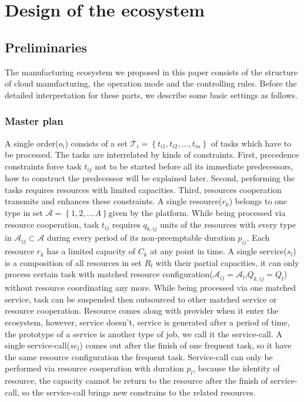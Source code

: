 \section{Design of the ecosystem} %
\label{sec:design_of_the_ecosystem}
\subsection{Preliminaries} %
\label{sub:preliminaries}
The manufacturing ecosystem we proposed in this paper consists of the structure of cloud manufacturing, the operation mode and the controlling rules. Before the detailed interpretation for these parts, we describe some basic settings as follows.

\subsubsection{Master plan} %
\label{ssub:master_plam}
A single order($o_i$) consists of a set $\mathcal{T}_i = \left\{ t_{i1},t_{i2},\dots,t_{in}\right\}$ of tasks which have to be processed. The tasks are interrelated by kinds of constraints. First, precedence constraints force task $t_{ij}$ not to be started before all its immediate predecessors, how to construct the predecessor will be explained later. Second, performing the tasks requires resources with limited capacities. Third, resources cooperation transmits and enhances these constraints.
A single resource($r_k$) belongs to one type in set $\mathcal{A} = \left\{1,2,\dots\,A\right\}$given by the platform. While being processed via resource cooperation, task $t_{ij}$ requires $q_{k,ij}$ units of the resources with every type in $\mathcal{A}_{ij}\subset\mathcal{A}$ during every period of its non-preemptable duration $p_{ij}$. Each resource $r_k$ has a limited capacity of $C_k$ at any point in time.
A single service($s_l$) is a composition of all resources in set $R_l$ with their partial capacities, it can only process certain task with matched resource configuration($\mathcal{A}_{ij}=\mathcal{A}_l$,$Q_{k,ij}=Q_l$) without resource coordinating any more. While being processed via one matched service, task can be suspended then outsourced to other matched service or resource cooperation.
Resource comes along with provider when it enter the ecosystem, however, service doesn't, service is generated after a period of time, the prototype of a service is another type of job, we call it the service-call.
A single service-call($sc_l$) comes out after the finish of one frequent task, so it have the same resource configuration the frequent task. Service-call can only be performed via resource cooperation with duration $p_l$, because the identity of resource, the capacity cannot be return to the resource after the finish of service-call, so the service-call brings new constrains to the related resources.  

